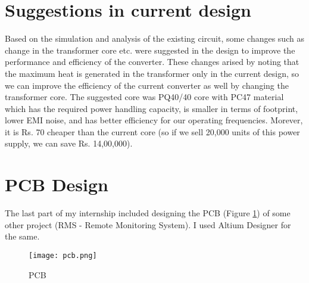 \section{Suggestions in current design}
Based on the simulation and analysis of the existing circuit, some changes such as change in the transformer core etc. were suggested in the design to improve the performance and efficiency of the converter. These changes arised by noting that the maximum heat is generated in the transformer only in the current design, so we can improve the efficiency of the current converter as well by changing the transformer core.
The suggested core was PQ40/40 core with PC47 material which has the required power handling capacity, is smaller in terms of footprint, lower EMI noise, and has better efficiency for our operating frequencies. Morever, it is Rs. 70 cheaper than the current core (so if we sell 20,000 units of this power supply, we can save Rs. 14,00,000).

\section{PCB Design}
The last part of my internship included designing the PCB (Figure \ref*{fig:pcb_out}) of some other project (RMS - Remote Monitoring System). I used Altium Designer for the same.
\begin{figure}[H]
    \centering
    \texttt{[image: pcb.png]}
    \caption{PCB}
    \label{fig:pcb_out}
\end{figure}